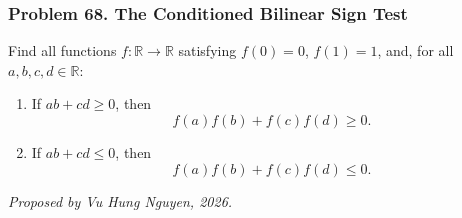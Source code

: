\subsubsection*{Problem 68. The Conditioned Bilinear Sign Test}

\begin{exercisebox}[hard]

Find all functions $f:\mathbb R\to\mathbb R$ satisfying $f(0)=0$, $f(1)=1$, and,
for all $a,b,c,d\in\mathbb R$:
\begin{enumerate}
    \item If $ab+cd\geq0$, then
          \[
          f(a)f(b)+f(c)f(d)\geq0.
          \]
    \item If $ab+cd\leq0$, then
          \[
          f(a)f(b)+f(c)f(d)\leq0.
          \]
\end{enumerate}

\begin{flushright}
\textit{Proposed by Vu Hung Nguyen, 2026.}
\end{flushright}


\end{exercisebox}